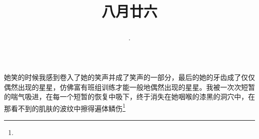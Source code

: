 \title{\date[d=28,m=9,y=2024][year:cn-y,年,month:cn,day:cn,日,·,weekday]·八月廿六 }
她笑的时候我感到卷入了她的笑声并成了笑声的一部分，最后的她的牙齿成了仅仅偶然出现的星星，仿佛富有班组训练才能一般地偶然出现的星星。我被一次次短暂的喘气吸进，在每一个短暂的恢复中吸下，终于消失在她咽喉的漆黑的洞穴中，在那看不到的肌肤的波纹中擦得遍体鳞伤\footnote{ }

